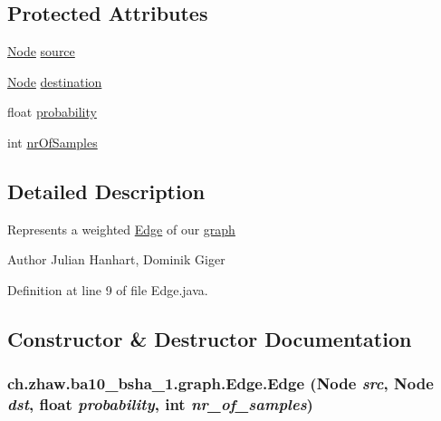 \subsection*{Protected Attributes}
\begin{DoxyCompactItemize}
\item 
\hyperlink{classch_1_1zhaw_1_1ba10__bsha__1_1_1graph_1_1Node}{Node} \hyperlink{classch_1_1zhaw_1_1ba10__bsha__1_1_1graph_1_1Edge_a3593144bcc6c3034968a8608f11191f7}{source}
\item 
\hyperlink{classch_1_1zhaw_1_1ba10__bsha__1_1_1graph_1_1Node}{Node} \hyperlink{classch_1_1zhaw_1_1ba10__bsha__1_1_1graph_1_1Edge_afa6d59aea26f9d343e7f7145fad87579}{destination}
\item 
float \hyperlink{classch_1_1zhaw_1_1ba10__bsha__1_1_1graph_1_1Edge_ab718be8d9785b729e2f34a95e1560eb8}{probability}
\item 
int \hyperlink{classch_1_1zhaw_1_1ba10__bsha__1_1_1graph_1_1Edge_a54657658be3fa498c1a4c0f5d4ef57c6}{nrOfSamples}
\end{DoxyCompactItemize}


\subsection{Detailed Description}
Represents a weighted \hyperlink{classch_1_1zhaw_1_1ba10__bsha__1_1_1graph_1_1Edge}{Edge} of our \hyperlink{namespacech_1_1zhaw_1_1ba10__bsha__1_1_1graph}{graph}

\begin{DoxyAuthor}{Author}
Julian Hanhart, Dominik Giger 
\end{DoxyAuthor}


Definition at line 9 of file Edge.java.

\subsection{Constructor \& Destructor Documentation}
\hypertarget{classch_1_1zhaw_1_1ba10__bsha__1_1_1graph_1_1Edge_ac088e352be6ca6129cc4ebed08a95e29}{
\subsubsection[{Edge}]{\setlength{\rightskip}{0pt plus 5cm}ch.zhaw.ba10\_\-bsha\_\-1.graph.Edge.Edge ({\bf Node} {\em src}, \/  {\bf Node} {\em dst}, \/  float {\em probability}, \/  int {\em nr\_\-of\_\-samples})}}
\label{classch_1_1zhaw_1_1ba10__bsha__1_1_1graph_1_1Edge_ac088e352be6ca6129cc4ebed08a95e29}


